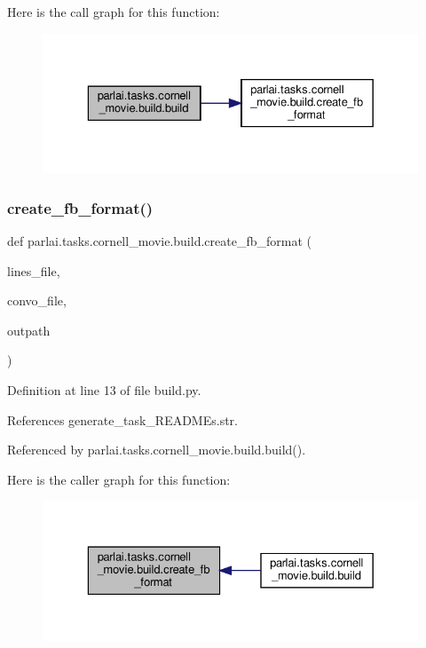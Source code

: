Here is the call graph for this function\+:
\nopagebreak
\begin{figure}[H]
\begin{center}
\leavevmode
\includegraphics[width=329pt]{namespaceparlai_1_1tasks_1_1cornell__movie_1_1build_aced5c0daa1d9fa613eb87535e22f1b47_cgraph}
\end{center}
\end{figure}
\mbox{\label{namespaceparlai_1_1tasks_1_1cornell__movie_1_1build_ad02efe0879bce0da293ba177112e1af3}} 
\subsubsection{\texorpdfstring{create\+\_\+fb\+\_\+format()}{create\_fb\_format()}}
{\footnotesize\ttfamily def parlai.\+tasks.\+cornell\+\_\+movie.\+build.\+create\+\_\+fb\+\_\+format (\begin{DoxyParamCaption}\item[{}]{lines\+\_\+file,  }\item[{}]{convo\+\_\+file,  }\item[{}]{outpath }\end{DoxyParamCaption})}



Definition at line 13 of file build.\+py.



References generate\+\_\+task\+\_\+\+R\+E\+A\+D\+M\+Es.\+str.



Referenced by parlai.\+tasks.\+cornell\+\_\+movie.\+build.\+build().

Here is the caller graph for this function\+:
\nopagebreak
\begin{figure}[H]
\begin{center}
\leavevmode
\includegraphics[width=329pt]{namespaceparlai_1_1tasks_1_1cornell__movie_1_1build_ad02efe0879bce0da293ba177112e1af3_icgraph}
\end{center}
\end{figure}

